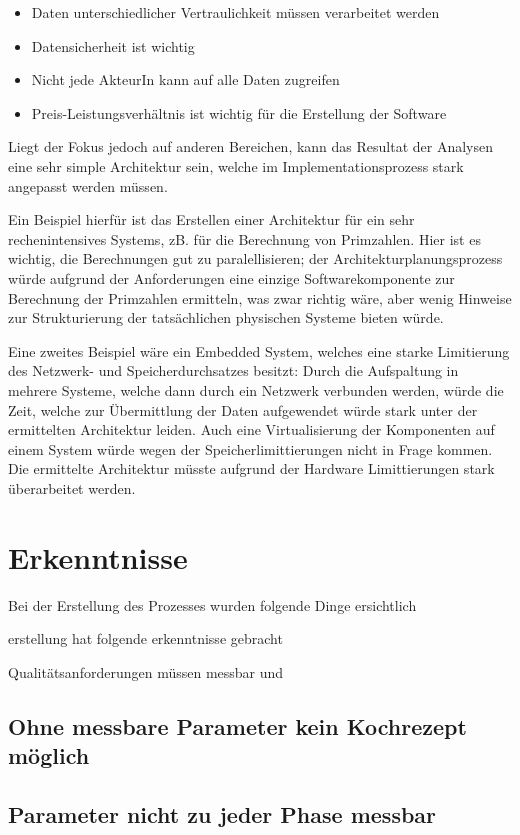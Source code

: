 \begin{itemize}
  \item Daten unterschiedlicher Vertraulichkeit müssen verarbeitet werden
  \item Datensicherheit ist wichtig
  \item Nicht jede AkteurIn kann auf alle Daten zugreifen
  \item Preis-Leistungsverhältnis ist wichtig für die Erstellung der Software
\end{itemize}

Liegt der Fokus jedoch auf anderen Bereichen, kann das Resultat der Analysen eine sehr simple Architektur sein, welche im Implementationsprozess stark angepasst werden müssen.

Ein Beispiel hierfür ist das Erstellen einer Architektur für ein sehr rechenintensives Systems, zB. für die Berechnung von Primzahlen. Hier ist es wichtig, die Berechnungen gut zu paralellisieren; der Architekturplanungsprozess würde aufgrund der Anforderungen eine einzige Softwarekomponente zur Berechnung der Primzahlen ermitteln, was zwar richtig wäre, aber wenig Hinweise zur Strukturierung der tatsächlichen physischen Systeme bieten würde.

Eine zweites Beispiel wäre ein Embedded System, welches eine starke Limitierung des Netzwerk- und Speicherdurchsatzes besitzt: Durch die Aufspaltung in mehrere Systeme, welche dann durch ein Netzwerk verbunden werden, würde die Zeit, welche zur Übermittlung der Daten aufgewendet würde stark unter der ermittelten Architektur leiden. Auch eine Virtualisierung der Komponenten auf einem System würde wegen der Speicherlimittierungen nicht in Frage kommen. Die ermittelte Architektur müsste aufgrund der Hardware Limittierungen stark überarbeitet werden.

\section{Erkenntnisse}
Bei der Erstellung des Prozesses wurden folgende Dinge ersichtlich


erstellung hat folgende erkenntnisse gebracht

Qualitätsanforderungen müssen messbar und

\subsection{Ohne messbare Parameter kein Kochrezept möglich}
\subsection{Parameter nicht zu jeder Phase messbar}
